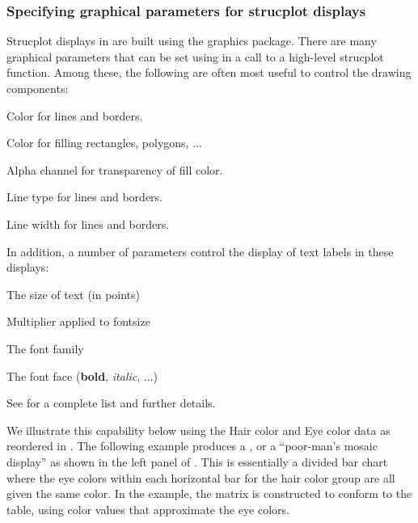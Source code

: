 \documentclass[11pt]{book}\usepackage[]{graphicx}\usepackage[]{color}
\begin{document}
\subsubsection{Specifying graphical parameters for strucplot displays}
Strucplot displays in  are built using the  graphics package.
There are many graphical parameters that can be set using 
in a call to a high-level strucplot function.  Among these, the following are
often most useful to control the drawing components:
\begin{proglist}
  \item[\code{col}]   Color for lines and borders.
  \item[\code{fill}] 	Color for filling rectangles, polygons, ...
  \item[\code{alpha}] 	Alpha channel for transparency of fill color.
  \item[\code{lty}] 	Line type for lines and borders.
  \item[\code{lwd}] 	Line width for lines and borders.
\end{proglist}
In addition, a number of parameters control the display of text labels in these displays:
\begin{proglist}
  \item[\code{fontsize}]   The size of text (in points)
  \item[\code{cex}] 	Multiplier applied to fontsize
  \item[\code{fontfamily}] 	The font family
  \item[\code{fontface}] 	The font face (\textbf{bold}, \textit{italic}, ...)
\end{proglist}
See  for a complete list and further details.

We illustrate this capability below using the Hair color and Eye color data
as reordered in .  The following example produces
a , or a ``poor-man's mosaic display''
as shown in the left panel of .
This is 
essentially a divided bar chart where the eye colors
within each horizontal bar for the hair color group are all given the same
color.  In the example,
the matrix  is constructed to conform to the
 table, using color values that approximate the eye colors.
\end{document}
